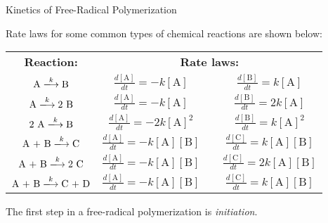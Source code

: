 \begin{activity}{Kinetics of Free-Radical Polymerization}
\begin{instructornotes}
\end{instructornotes}


\begin{model}
	\label{\labelbase:mdl:kineticeqns}

	Rate laws for some common types of chemical reactions are shown below:
	
	\vspace{-6pt}
	\begin{center}
		\renewcommand{\arraystretch}{2}
		\begin{tabular}{c c c c}
			\hspace{2cm}\textbf{Reaction:}\hspace{2cm} & \multicolumn{3}{c}{\hspace{0.5cm}\textbf{Rate laws:}\hspace{0.5cm}} \\
			$ \text{A} \xlongrightarrow{k} \text{B}$ & $\frac{d[\text{A}]}{dt} = -k[\text{A}]$ && $\frac{d[\text{B}]}{dt} = k[\text{A}]$ \\
			$ \text{A} \xlongrightarrow{k} 2\text{ B}$ & $\frac{d[\text{A}]}{dt} = -k[\text{A}]$ && $\frac{d[\text{B}]}{dt} = 2k[\text{A}]$ \\
			$\text{2 A} \xlongrightarrow{k} \text{B}$ & $\frac{d[\text{A}]}{dt} = -2k[\text{A}]^2$ && $\frac{d[\text{B}]}{dt} = k[\text{A}]^2$ \\
			$\text{A + B} \xlongrightarrow{k} \text{C}$ & $\frac{d[\text{A}]}{dt} = -k[\text{A}][\text{B}]$ && $\frac{d[\text{C}]}{dt} = k[\text{A}][\text{B}]$ \\
			$\text{A + B} \xlongrightarrow{k} \text{2 C}$ & $\frac{d[\text{A}]}{dt} = -k[\text{A}][\text{B}]$ && $\frac{d[\text{C}]}{dt} = 2 k[\text{A}][\text{B}]$ \\
			$\text{A + B} \xlongrightarrow{k} \text{C + D}$ & $\frac{d[\text{A}]}{dt} = -k[\text{A}][\text{B}]$ && $\frac{d[\text{C}]}{dt} = k[\text{A}][\text{B}]$ \\
		\end{tabular}
	\end{center}
	\vspace{6pt}
	
\end{model}


\begin{ctqs}

	\question The first step in a free-radical polymerization is \emph{initiation}.  
		
		\begin{enumerate}
		

\end{enumerate}
\end{ctqs}
\end{activity}

